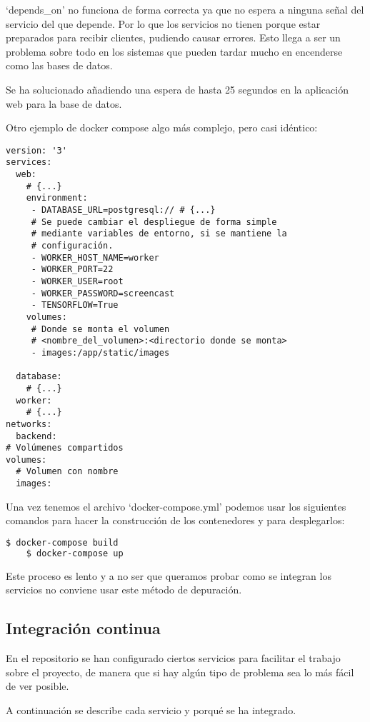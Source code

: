 `depends\_on' no funciona de forma correcta ya que no espera a ninguna señal del servicio del que depende. Por lo que los servicios no tienen porque estar preparados para recibir clientes, pudiendo causar errores. Esto llega a ser un problema sobre todo en los sistemas que pueden tardar mucho en encenderse como las bases de datos.

Se ha solucionado añadiendo una espera de hasta 25 segundos en la aplicación web para la base de datos.

Otro ejemplo de docker compose algo más complejo, pero casi idéntico:


\begin{lstlisting}[language=dockercompose]
version: '3'
services:
  web:
    # {...}
    environment:
     - DATABASE_URL=postgresql:// # {...}
     # Se puede cambiar el despliegue de forma simple
     # mediante variables de entorno, si se mantiene la 
     # configuración.
     - WORKER_HOST_NAME=worker
     - WORKER_PORT=22
     - WORKER_USER=root
     - WORKER_PASSWORD=screencast
     - TENSORFLOW=True
    volumes:
     # Donde se monta el volumen 
     # <nombre_del_volumen>:<directorio donde se monta>
     - images:/app/static/images
 
  database:
    # {...}  
  worker:
    # {...}
networks:
  backend:
# Volúmenes compartidos
volumes:
  # Volumen con nombre
  images:
\end{lstlisting}


Una vez tenemos el archivo `docker-compose.yml' podemos usar los siguientes comandos para hacer la construcción de los contenedores y para desplegarlos:

\lstset{style=linestyle}
\begin{lstlisting}[language=bash]
    $ docker-compose build
    $ docker-compose up
\end{lstlisting}

Este proceso es lento y a no ser que queramos probar como se integran los servicios no conviene usar este método de depuración.

\subsection{Integración continua}

En el repositorio se han configurado ciertos servicios para facilitar el trabajo sobre el proyecto, de manera que si hay algún tipo de problema sea lo más fácil de ver posible. 

A continuación se describe cada servicio y porqué se ha integrado.

